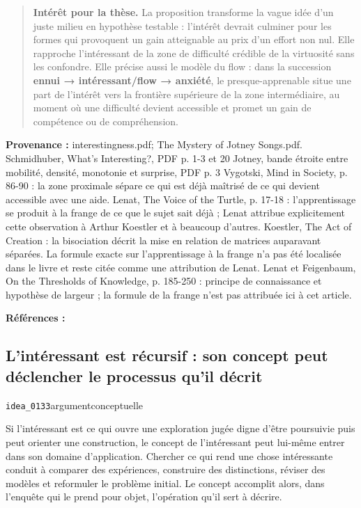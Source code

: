 \documentclass[10pt,a4paper]{article}
\begin{document}
\begin{quote}
\textbf{Intérêt pour la thèse.} La proposition transforme la vague idée d'un juste milieu en hypothèse testable : l'intérêt devrait culminer pour les formes qui provoquent un gain atteignable au prix d'un effort non nul. Elle rapproche l'intéressant de la zone de difficulté crédible de la virtuosité sans les confondre. Elle précise aussi le modèle du flow : dans la succession \textbf{ennui → intéressant/flow → anxiété}, le presque-apprenable situe une part de l'intérêt vers la frontière supérieure de la zone intermédiaire, au moment où une difficulté devient accessible et promet un gain de compétence ou de compréhension.
\end{quote}
{\footnotesize\color{metadata}\textbf{Provenance :} interestingness.pdf; The Mystery of Jotney Songs.pdf. Schmidhuber, What's Interesting?, PDF p. 1-3 et 20 Jotney, bande étroite entre mobilité, densité, monotonie et surprise, PDF p. 3 Vygotski, Mind in Society, p. 86-90 : la zone proximale sépare ce qui est déjà maîtrisé de ce qui devient accessible avec une aide. Lenat, The Voice of the Turtle, p. 17-18 : l'apprentissage se produit à la frange de ce que le sujet sait déjà ; Lenat attribue explicitement cette observation à Arthur Koestler et à beaucoup d'autres. Koestler, The Act of Creation : la bisociation décrit la mise en relation de matrices auparavant séparées. La formule exacte sur l'apprentissage à la frange n'a pas été localisée dans le livre et reste citée comme une attribution de Lenat. Lenat et Feigenbaum, On the Thresholds of Knowledge, p. 185-250 : principe de connaissance et hypothèse de largeur ; la formule de la frange n'est pas attribuée ici à cet article.\par}
{\footnotesize\color{metadata}\textbf{Références :} \parencite{schmidhuber1997interesting,vygotsky1978mind,lenat2008turtle,lenat1991thresholds,koestler1989act}\par}

\subsection{L'intéressant est récursif : son concept peut déclencher le processus qu'il décrit}
{\small\color{metadata} \texttt{idea\_0133}\quad\textbullet\quad argument\quad\textbullet\quad conceptuelle\par}

Si l'intéressant est ce qui ouvre une exploration jugée digne d'être poursuivie puis peut orienter une construction, le concept de l'intéressant peut lui-même entrer dans son domaine d'application. Chercher ce qui rend une chose intéressante conduit à comparer des expériences, construire des distinctions, réviser des modèles et reformuler le problème initial. Le concept accomplit alors, dans l'enquête qui le prend pour objet, l'opération qu'il sert à décrire.
\end{document}
